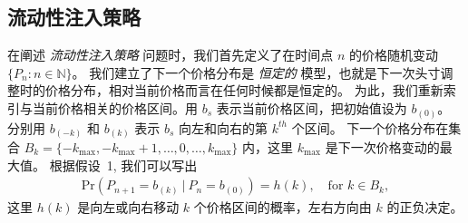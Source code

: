 \documentclass[sigconf, dvipsnames]{acmart}
\newcommand{\dcp}[1]{\textcolor{blue}{{\scriptsize{David:}}#1}}
\newcommand{\dcpadd}[1]{\textcolor{english}{#1}}
\begin{document}

\subsection{流动性注入策略}\label{sec:lpstrat}

\quad 在阐述 \textit{流动性注入策略} 问题时，我们首先定义了在时间点 $n$ 的价格随机变动 $\{ P_n : n \in \mathbb{N} \}$。
%
%
%
%
%
%
我们建立了下一个价格分布是 {\em 恒定的} 模型，也就是下一次头寸调整时的价格分布，相对当前价格而言在任何时候都是恒定的。
为此，我们重新索引与当前价格相关的价格区间。用 $b_s$ 表示当前价格区间，把初始值设为 $b_{(0)}$。
分别用 $b_{(-k)}$ 和 $b_{(k)}$ 表示 $b_{s}$ 向左和向右的第 $k^{th}$ 个区间。 
%
下一个价格分布在集合 $B_k = \{-k_{\max}, -k_{\max}+1, \ldots, 0, \ldots, k_{\max}\}$ 内，这里 $k_{\max}$ 是下一次价格变动的最大值。
%
根据假设~1, 我们可以写出 
%
\begin{align}
    \mathrm{Pr}\left(P_{n+1}=b_{(k)}~|~P_n=b_{(0)}\right)=h(k),  \quad \text{for } k \in B_k,
\end{align}
%
这里 $h(k)$ 是向左或向右移动 $k$ 个价格区间的概率，左右方向由 $k$ 的正负决定。  
%
\end{document}
